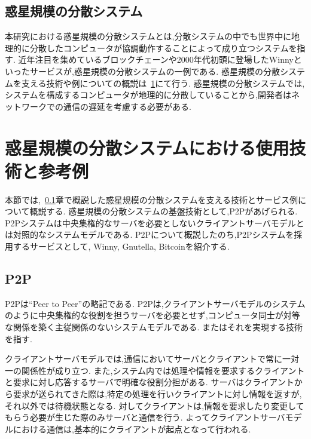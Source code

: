 \subsection{惑星規模の分散システム}
\label{bg:definition:planetary-scale-distributed-system}

本研究における惑星規模の分散システムとは,分散システムの中でも世界中に地理的に分散したコンピュータが協調動作することによって成り立つシステムを指す.
近年注目を集めているブロックチェーンや2000年代初頭に登場したWinnyといったサービスが,惑星規模の分散システムの一例である.
惑星規模の分散システムを支える技術や例についての概説は~\ref{bg:planetary-scale-distributed-system}にて行う.
惑星規模の分散システムでは,システムを構成するコンピュータが地理的に分散していることから,開発者はネットワークでの通信の遅延を考慮する必要がある.

\section{惑星規模の分散システムにおける使用技術と参考例}
\label{bg:planetary-scale-distributed-system}

本節では,~\ref{bg:definition:planetary-scale-distributed-system}章で概説した惑星規模の分散システムを支える技術とサービス例について概説する.
惑星規模の分散システムの基盤技術として,P2Pがあげられる.
P2Pシステムは中央集権的なサーバを必要としないクライアントサーバモデルとは対照的なシステムモデルである.
P2Pについて概説したのち,P2Pシステムを採用するサービスとして, Winny, Gnutella, Bitcoinを紹介する.

\subsection{P2P}
\label{bg:planetary-scale-distributed-system:p2p}

P2Pは``Peer to Peer''の略記である.
P2Pは,クライアントサーバモデルのシステムのように中央集権的な役割を担うサーバを必要とせず,コンピュータ同士が対等な関係を築く主従関係のないシステムモデルである.
またはそれを実現する技術を指す.

クライアントサーバモデルでは,通信においてサーバとクライアントで常に一対一の関係性が成り立つ.
また,システム内では処理や情報を要求するクライアントと要求に対し応答するサーバで明確な役割分担がある.
サーバはクライアントから要求が送られてきた際は,特定の処理を行いクライアントに対し情報を返すが,それ以外では待機状態となる.
対してクライアントは,情報を要求したり変更してもらう必要が生じた際のみサーバと通信を行う.
よってクライアントサーバモデルにおける通信は,基本的にクライアントが起点となって行われる.

